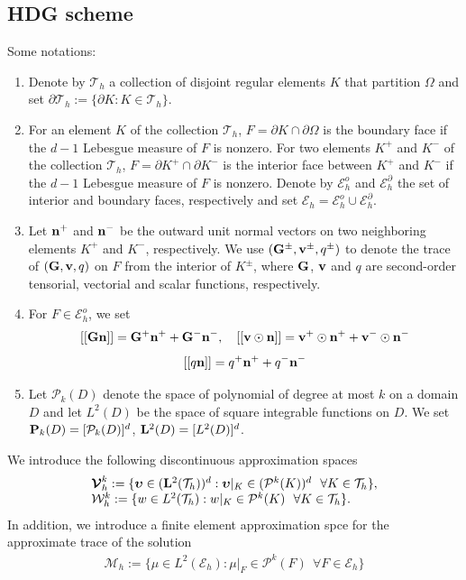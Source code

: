 \documentclass[10pt,reqno, final]{amsart}
\begin{document}
\subsection{HDG scheme}
Some notations:
\begin{enumerate}
\item Denote by $\mathcal{T}_h$ a collection of disjoint regular elements $K$ that partition $\Omega$
and set $\partial\mathcal{T}_h:=\{\partial K: K\in\mathcal{T}_h\}$.

\item For an element $K$ of the collection $\mathcal{T}_h$, $F=\partial K\cap\partial\Omega$ is the
boundary face if the $d-1$ Lebesgue measure of $F$ is nonzero. For two elements $K^+$ and $K^-$ of
the collection $\mathcal{T}_h$, $F=\partial K^+\cap\partial K^-$ is the interior face between $K^+$
and $K^-$ if the $d-1$ Lebesgue measure of $F$ is nonzero. Denote by $\mathcal{E}_h^o$ and $\mathcal{E}_h^{\partial}$
the set of interior and boundary faces, respectively and set $\mathcal{E}_h=\mathcal{E}_h^o\cup\mathcal{E}_h^{\partial}$.

\item Let ${\bf n}^+$ and ${\bf n}^-$ be the outward unit normal vectors on two neighboring elements $K^+$ and $K^-$, respectively.
We use $({\bf G}^{\pm}, {\bf v}^{\pm}, q^{\pm})$ to denote the trace of $({\bf G}, {\bf v}, q)$ on $F$ from the interior
of $K^{\pm}$, where ${\bf G}$, ${\bf v}$ and $q$ are second-order tensorial, vectorial and scalar functions, respectively.

\item For $F\in\mathcal{E}_h^o$, we set
$$[[{\bf Gn}]]={\bf G}^+{\bf n}^++{\bf G}^-{\bf n}^-,\quad [[{\bf v}\odot{\bf n}]]={\bf v}^+\odot{\bf n}^++{\bf v}^-\odot{\bf n}^-$$
$$[[q{\bf n}]]=q^+{\bf n}^++q^-{\bf n}^-$$

\item Let $\mathcal{P}_k(D)$ denote the space of polynomial of degree at most $k$ on a domain $D$ and let $L^2(D)$ be the space of square integrable functions on $D$. We set ${\bf P}_k(D)=[\mathcal{P}_k(D)]^d$, ${\bf L}^2(D)=[L^2(D)]^d$.
\end{enumerate}
We introduce the following discontinuous approximation spaces
\begin{equation}
\begin{array}{l}
\boldsymbol{\mathcal{V}}_h^k:=\{ \boldsymbol{\upsilon}\in ({\bf L}^2(\mathcal{T}_h))^d :\boldsymbol{\upsilon}|_K\in (\mathcal{P}^k(K))^d\ \ \forall K \in \mathcal{T}_h\},\\
\mathcal{W}_h^k:=\{w\in L^2(\mathcal{T}_h) :w|_K\in \mathcal{P}^k(K)\ \ \forall K \in \mathcal{T}_h\}.
\end{array}
\end{equation}
In addition, we introduce a finite element approximation spce for the approximate trace of the solution
\begin{equation}
\begin{array}{l}
\mathcal{M}_h:=\{\mu\in L^2(\mathcal{E}_h) :\mu|_F\in \mathcal{P}^k(F)\ \ \forall F \in \mathcal{E}_h\}
\end{array}
\end{equation}
\end{document}
